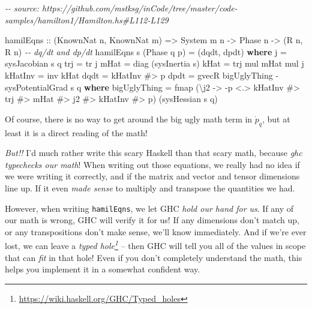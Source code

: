 \documentclass[]{article}
\newenvironment{Shaded}{}{}
\newcommand{\CommentTok}[1]{\textcolor[rgb]{0.38,0.63,0.69}{\textit{#1}}}
\newcommand{\DataTypeTok}[1]{\textcolor[rgb]{0.56,0.13,0.00}{#1}}
\newcommand{\FunctionTok}[1]{\textcolor[rgb]{0.02,0.16,0.49}{#1}}
\newcommand{\KeywordTok}[1]{\textcolor[rgb]{0.00,0.44,0.13}{\textbf{#1}}}
\newcommand{\NormalTok}[1]{#1}
\newcommand{\OperatorTok}[1]{\textcolor[rgb]{0.40,0.40,0.40}{#1}}
\newcommand{\OtherTok}[1]{\textcolor[rgb]{0.00,0.44,0.13}{#1}}
\renewcommand{\href}[2]{#2\footnote{\url{#1}}}
\begin{document}
\begin{Shaded}
\begin{Highlighting}[]
\CommentTok{{-}{-} source: https://github.com/mstksg/inCode/tree/master/code{-}samples/hamilton1/Hamilton.hs\#L112{-}L129}

\NormalTok{hamilEqns}
\OtherTok{    ::}\NormalTok{ (}\DataTypeTok{KnownNat}\NormalTok{ n, }\DataTypeTok{KnownNat}\NormalTok{ m)}
    \OtherTok{=>} \DataTypeTok{System}\NormalTok{ m n}
    \OtherTok{{-}>} \DataTypeTok{Phase}\NormalTok{ n}
    \OtherTok{{-}>}\NormalTok{ (}\DataTypeTok{R}\NormalTok{ n, }\DataTypeTok{R}\NormalTok{ n)       }\CommentTok{{-}{-} dq/dt and dp/dt}
\NormalTok{hamilEqns s (}\DataTypeTok{Phase}\NormalTok{ q p) }\OtherTok{=}\NormalTok{ (dqdt, dpdt)}
  \KeywordTok{where}
\NormalTok{    j       }\OtherTok{=}\NormalTok{ sysJacobian s q}
\NormalTok{    trj     }\OtherTok{=}\NormalTok{ tr j}
\NormalTok{    mHat    }\OtherTok{=}\NormalTok{ diag (sysInertia s)}
\NormalTok{    kHat    }\OtherTok{=}\NormalTok{ trj }\OtherTok{\textasciigrave{}mul\textasciigrave{}}\NormalTok{ mHat }\OtherTok{\textasciigrave{}mul\textasciigrave{}}\NormalTok{ j}
\NormalTok{    kHatInv }\OtherTok{=}\NormalTok{ inv kHat}
\NormalTok{    dqdt    }\OtherTok{=}\NormalTok{ kHatInv }\OperatorTok{\#>}\NormalTok{ p}
\NormalTok{    dpdt    }\OtherTok{=}\NormalTok{ gvecR bigUglyThing }\OperatorTok{{-}}\NormalTok{ sysPotentialGrad s q}
      \KeywordTok{where}
\NormalTok{        bigUglyThing }\OtherTok{=}
          \FunctionTok{fmap}\NormalTok{ (\textbackslash{}j2 }\OtherTok{{-}>} \OperatorTok{{-}}\NormalTok{p }\OperatorTok{<.>}\NormalTok{ kHatInv }\OperatorTok{\#>}\NormalTok{ trj }\OperatorTok{\#>}\NormalTok{ mHat }\OperatorTok{\#>}\NormalTok{ j2 }\OperatorTok{\#>}\NormalTok{ kHatInv }\OperatorTok{\#>}\NormalTok{ p)}
\NormalTok{               (sysHessian s q)}
\end{Highlighting}
\end{Shaded}

Of course, there is no way to get around the big ugly math term in
\(\dot{p}_q\), but at least it is a direct reading of the math!

\emph{But!!} I'd much rather write this scary Haskell than that scary math,
because \emph{ghc typechecks our math}! When writing out those equations, we
really had no idea if we were writing it correctly, and if the matrix and vector
and tensor dimensions line up. If it even \emph{made sense} to multiply and
transpose the quantities we had.

However, when writing \texttt{hamilEqns}, we let GHC \emph{hold our hand for
us}. If any of our math is wrong, GHC will verify it for us! If any dimensions
don't match up, or any transpositions don't make sense, we'll know immediately.
And if we're ever lost, we can leave a
\emph{\href{https://wiki.haskell.org/GHC/Typed_holes}{typed hole}} -- then GHC
will tell you all of the values in scope that can \emph{fit} in that hole! Even
if you don't completely understand the math, this helps you implement it in a
somewhat confident way.
\end{document}
